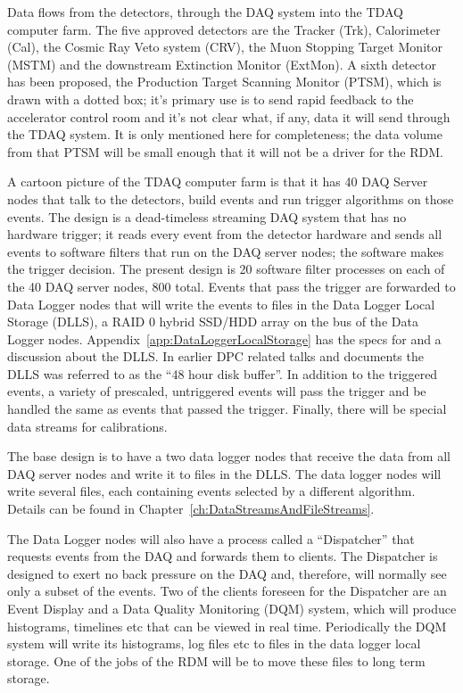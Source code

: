 Data flows from the detectors, through the DAQ system into the TDAQ computer farm.
The five approved detectors are the Tracker (Trk), Calorimeter (Cal), the Cosmic Ray Veto system (CRV),
the Muon Stopping Target Monitor (MSTM) and the downstream Extinction Monitor (ExtMon).
A sixth detector has been proposed, the Production Target Scanning Monitor (PTSM),
which is drawn with a dotted box;
it's primary use is to send rapid feedback to the accelerator control room
and it's not clear what, if any, data it will send through the TDAQ system.
It is only mentioned here for completeness;
the data volume from that PTSM will be small enough that it will not be
a driver for the RDM.

A cartoon picture of the TDAQ computer farm is that it has 40 DAQ Server nodes
that talk to the detectors, build events and run trigger algorithms on those events.
The design is a dead-timeless streaming DAQ system that has no hardware trigger;
it reads every event from the detector hardware and sends all events to software filters
that run on the DAQ server nodes;
the software makes the trigger decision.
The present design is 20 software filter processes on each of the 40 DAQ server nodes, 800 total.
Events that pass the trigger are forwarded to Data Logger nodes that will write the events
to files in the Data Logger Local Storage (DLLS), a RAID 0 hybrid SSD/HDD array on the bus of the Data Logger nodes.
Appendix~\ref{app:DataLoggerLocalStorage} has the specs for and a discussion about the DLLS.
In earlier DPC related talks and documents the DLLS  was referred to as the ``48 hour disk buffer''.
In addition to the triggered events, a variety of prescaled, untriggered events will pass the
trigger and be handled the same as events that passed the trigger.
Finally, there will be special data streams for calibrations.

The base design is to have a two data logger nodes that receive the data from all DAQ server nodes
and write it to files in the DLLS.
The data logger nodes will write several files, each containing events selected by a different algorithm.
Details can be found in Chapter~\ref{ch:DataStreamsAndFileStreams}.

The Data Logger nodes will also have a process called a ``Dispatcher''
that requests events from the DAQ and forwards them to clients.
The Dispatcher is designed to exert no back pressure on the DAQ
and, therefore, will normally see only a subset of the events.
Two of the clients foreseen for the Dispatcher are an Event Display and
a Data Quality Monitoring (DQM) system,
which will produce histograms, timelines etc that can be viewed in real time.
Periodically the DQM system will write its histograms, log files etc to
files in the data logger local storage.  One of the jobs of the RDM will be
to move these files to long term storage.

